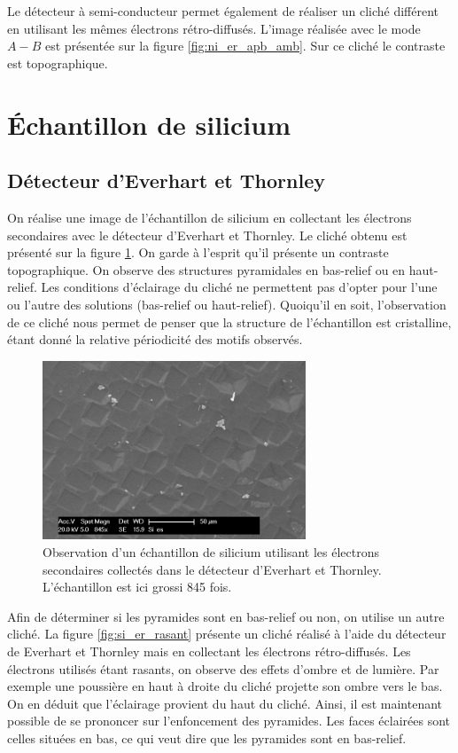 \documentclass[a4paper,12pt]{article}
\newcommand\ett{Everhart et Thornley\xspace}
\begin{document}
Le détecteur à semi-conducteur permet également de réaliser un cliché différent en utilisant les mêmes électrons
rétro-diffusés. L'image réalisée avec le mode $A-B$ est présentée sur la figure \ref{fig:ni_er_apb_amb}. Sur ce cliché
le contraste est topographique.


 

\section{Échantillon de silicium}

\subsection{Détecteur d'\ett}

On réalise une image de l'échantillon de silicium en collectant les électrons secondaires avec le détecteur d'\ett.
Le cliché obtenu est présenté sur la figure \ref{fig:si_es}. On garde à l'esprit qu'il présente un contraste topographique.
On observe des structures pyramidales en bas-relief ou en haut-relief. Les conditions d'éclairage du cliché ne permettent
pas d'opter pour l'une ou l'autre des solutions (bas-relief ou haut-relief). Quoiqu'il en soit, l'observation de ce cliché nous permet de penser que la structure de l'échantillon est cristalline, étant donné la relative périodicité des motifs observés.

\begin{figure}[h]
\centering
\includegraphics[width=0.7\textwidth]{images/si_es.png}
\caption{Observation d'un échantillon de silicium utilisant les électrons secondaires collectés dans le détecteur d'\ett. L'échantillon est ici grossi 845 fois.}
\label{fig:si_es}
\end{figure}

Afin de déterminer si les pyramides sont en bas-relief ou non, on utilise un autre cliché. La figure \ref{fig:si_er_rasant} présente
un cliché réalisé à l'aide du détecteur de \ett mais en collectant les électrons rétro-diffusés. Les électrons utilisés étant rasants,
on observe des effets d'ombre et de lumière. Par exemple une poussière en haut à droite du cliché projette son ombre vers le bas.
On en déduit que l'éclairage provient du haut du cliché. Ainsi, il est maintenant possible de se prononcer sur l'enfoncement des pyramides.
Les faces éclairées sont celles situées en bas, ce qui veut dire que les pyramides sont en bas-relief.
\end{document}
